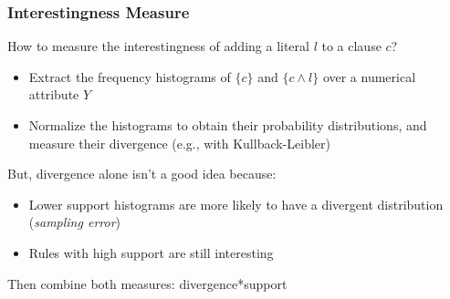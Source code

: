 \documentclass{beamer}
\begin{document}
\begin{frame}
\frametitle{Interestingness Measure}
  How to measure the interestingness of adding a literal $l$ to a clause $c$?
  \begin{itemize}
   \item Extract the frequency histograms of $\{c\}$ and $\{c \wedge l\}$ over a numerical attribute $Y$
   \item Normalize the histograms to obtain their probability distributions, and measure their divergence (e.g., with
Kullback-Leibler)
  \end{itemize}
  But, divergence alone isn't a good idea because:
  \begin{itemize}
   \item Lower support histograms are more likely to have a divergent distribution (\emph{sampling error})
   \item Rules with high support are still interesting
  \end{itemize}
  Then combine both measures: divergence*support
\end{frame}
\end{document}
